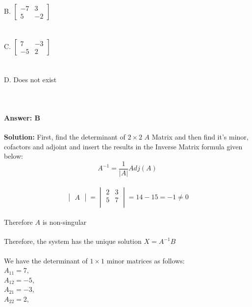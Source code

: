 \documentclass[prl,twocolumn,showpacs,preprintnumbers,superscriptaddress]{revtex4}
\theoremstyle{plain}
\theoremstyle{definition}
\begin{document}
\begin{widetext}
\\
\\
B. $\begin{bmatrix}   -7 & 3 \\ 5 & -2 \end{bmatrix}$\\
\\
\\
C. $\begin{bmatrix}   7 & -3 \\ -5 & 2 \end{bmatrix}$\\
\\
\\
D. Does not exist\\
\\
\\
\\
\textbf{Answer: B}
\\
\\
\textbf{Solution:}
First, find the determinant of $2 \times  2$ $A$ Matrix and then find it’s minor, cofactors and adjoint and insert the results in the Inverse Matrix formula given below:
\begin{equation}
A^{-1}=\frac{1}{|A|} Adj(A) {}\nonumber
\end{equation}
\\
\[
\begin{vmatrix}    A \end{vmatrix} =\begin{vmatrix}    2 & 3 \\     5 & 7  \\  \end{vmatrix} = 14 - 15 = -1 \neq 0 
\]
\\
Therefore $A$ is non-singular
\\
\\
Therefore, the system has the unique solution $X=A^{-1}B$
\\
\\
We have the determinant of $1 \times  1$ minor matrices as follows:
\\
$A_{11} = 7$,\\
$A_{12} = -5$,\\
$A_{21} = -3$,\\
$A_{22} = 2$,\\


\end{widetext}
\end{document}
